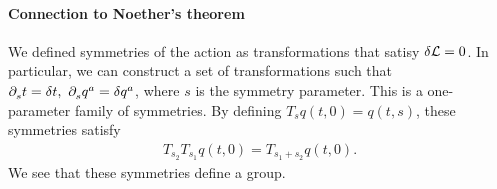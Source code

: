 \paragraph{Connection to Noether's theorem}
We defined symmetries of the action as transformations that satisy $\delta \mathcal{L} = 0$. In particular, we can construct a set of transformations such that $\partial^{}_{s}t = \delta t,\ \partial^{}_{s}q^{a} = \delta q^{a}$, where $s$ is the symmetry parameter. This is a one-parameter family of symmetries. By defining $T_{s}q(t, 0) = q(t, s)$, these symmetries satisfy
\begin{align*}
T_{s_{2}}T_{s_{1}}q(t, 0) = T_{s_{1} + s_{2}}q(t, 0).
\end{align*}
We see that these symmetries define a group.

